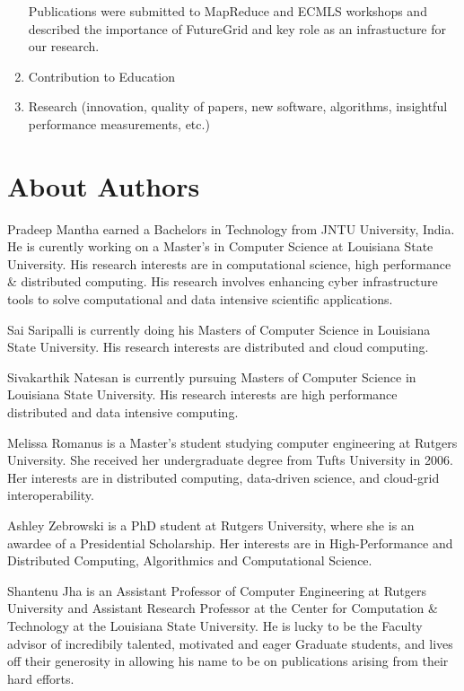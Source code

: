 \documentclass[]{paper}
\begin{document}
\begin{enumerate}
Publications were submitted to MapReduce and ECMLS workshops and described the importance of FutureGrid and key role as an infrastucture for our research.

\item Contribution to Education
\item Research (innovation, quality of papers, new software, algorithms, insightful performance measurements, etc.)
\end{enumerate}


\section{About Authors} 

Pradeep Mantha earned a Bachelors in Technology from JNTU University, India. He is curently working on a Master's in Computer Science at
Louisiana State University. His research interests are in computational science, high performance \& distributed computing. His research involves enhancing
cyber infrastructure tools to solve computational and data intensive scientific applications.

Sai Saripalli is currently doing his Masters of Computer Science in Louisiana State University. His research interests are distributed and cloud computing. 

Sivakarthik Natesan is currently pursuing Masters of Computer Science in Louisiana State University. His research interests are high performance distributed and data intensive computing.

Melissa Romanus is a Master's student studying computer engineering at Rutgers University. She received her undergraduate degree from Tufts University in 2006. Her interests are in distributed computing, data-driven science, and cloud-grid interoperability.

Ashley Zebrowski is a PhD student at Rutgers University, where she is an awardee of a Presidential Scholarship. Her interests are in High-Performance and Distributed Computing, Algorithmics and Computational Science.

Shantenu Jha is an Assistant Professor of Computer Engineering at Rutgers University and Assistant Research Professor at the Center for Computation \& Technology at the Louisiana State University. He is lucky to be the Faculty advisor of incredibily talented, motivated and eager Graduate students, and lives off their generosity in allowing his name to be on publications arising from their hard efforts.
\end{document}
